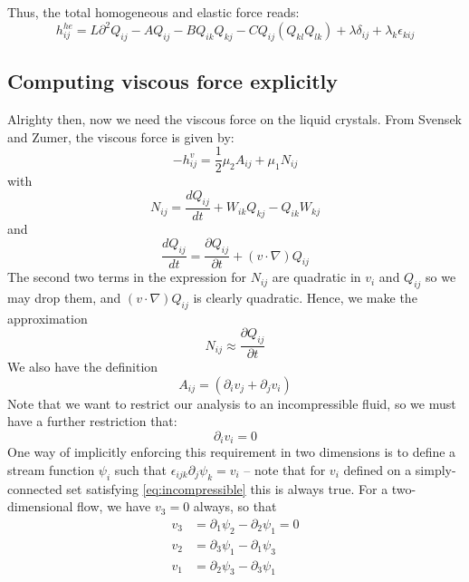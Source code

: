 \documentclass[reqno]{article}
\begin{document}
	Thus, the total homogeneous and elastic force reads:
	\begin{equation}
		h^{he}_{ij} = L\partial^2 Q_{ij} - A Q_{ij} - BQ_{ik}Q_{kj} - C Q_{ij} (Q_{kl}Q_{lk}) + \lambda\delta_{ij} + \lambda_k \epsilon_{kij}
	\end{equation}
	
	\subsection{Computing viscous force explicitly}
	Alrighty then, now we need the viscous force on the liquid crystals. From Svensek and Zumer, the viscous force is given by:
	\begin{equation}
		-h^v_{ij} = \frac{1}{2} \mu_2 A_{ij} + \mu_1 N_{ij}
	\end{equation}
	with 
	\begin{equation}
		N_{ij} = \frac{d Q_{ij}}{dt} + W_{ik} Q_{kj} - Q_{ik} W_{kj}
	\end{equation}
	and
	\begin{equation}
		\frac{d Q_{ij}}{dt} = \frac{\partial Q_{ij}}{\partial t} + (v\cdot \nabla)Q_{ij}
	\end{equation}
	The second two terms in the expression for $N_{ij}$ are quadratic in $v_i$ and $Q_{ij}$ so we may drop them, and $(v\cdot \nabla)Q_{ij}$ is clearly quadratic. Hence, we make the approximation
	\begin{equation}
		N_{ij} \approx \frac{\partial Q_{ij}}{\partial t}
	\end{equation}
	We also have the definition
	\begin{equation}
		A_{ij} = (\partial_i v_j + \partial_j v_i)
	\end{equation}
	Note that we want to restrict our analysis to an incompressible fluid, so we must have a further restriction that:
	\begin{equation}\label{eq:incompressible}
		\partial_i v_i = 0
	\end{equation}
	One way of implicitly enforcing this requirement in two dimensions is to define a stream function $\psi_i$ such that $\epsilon_{ijk}\partial_j \psi_k = v_i$ -- note that for $v_i$ defined on a simply-connected set satisfying \eqref{eq:incompressible} this is always true. For a two-dimensional flow, we have $v_3 = 0$ always, so that 
	\begin{equation}
	\begin{split}
		v_3 &= \partial_1 \psi_2 - \partial_2 \psi_1 = 0 \\
		v_2 &= \partial_3 \psi_1 - \partial_1 \psi_3 \\
		v_1 &= \partial_2 \psi_3 - \partial_3 \psi_1
	\end{split}
	\end{equation}
\end{document}
